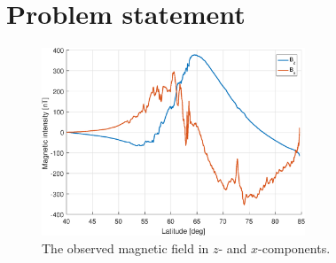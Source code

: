 \section{Problem statement}
\begin{figure}[ht!]
    \centering
    \includegraphics[width=0.7\textwidth]{fig/observedData.eps}
    \caption{The observed magnetic field in $z$- and $x$-components.}
    \label{fig:obsData}
\end{figure}